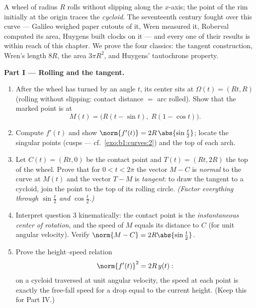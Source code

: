 \begin{problem}\label{pb:b1:curves:1}
A wheel of radius $R$ rolls without slipping along the $x$-axis;
the point of the rim initially at the origin traces the
\emph{cycloid}. The seventeenth century fought over this curve
--- Galileo weighed paper cutouts of it, Wren measured it,
Roberval computed its area, Huygens built clocks on it --- and
every one of their results is within reach of this chapter. We
prove the four classics: the tangent construction, Wren's length
$8R$, the area $3\pi R^2$, and Huygens' tautochrone
property.

\medskip
\noindent\textbf{Part I --- Rolling and the tangent.}
\begin{enumerate}
  \item After the wheel has turned by an angle $t$, its center
        sits at $\Omega(t) = (Rt, R)$ (rolling without slipping:
        contact distance $=$ arc rolled). Show that the marked
        point is at
        \[
        M(t) = \bigl(R(t - \sin t),\; R(1 - \cos t)\bigr).
        \]
  \item Compute $f'(t)$ and show $\norm{f'(t)} =
        2R\,\abs{\sin\frac t2}$; locate the singular points
        (cusps --- cf.\ \cref{exo:b1:curves:2}) and the top of
        each arch.
  \item Let $C(t) = (Rt, 0)$ be the contact point and $T(t) =
        (Rt, 2R)$ the top of the wheel. Prove that for $0 < t <
        2\pi$ the vector $M - C$ is \emph{normal} to the curve at
        $M(t)$ and the vector $T - M$ is \emph{tangent}: to draw
        the tangent to a cycloid, join the point to the top of
        its rolling circle. \emph{(Factor everything through
        $\sin\frac t2$ and $\cos\frac t2$.)}
  \item Interpret question 3 kinematically: the contact point is
        the \emph{instantaneous center of rotation}, and the
        speed of $M$ equals its distance to $C$ (for unit angular
        velocity). Verify $\norm{M - C} = 2R\abs{\sin\frac t2}$.
  \item Prove the height--speed relation
        \[
        \norm{f'(t)}^2 = 2R\,y(t) :
        \]
        on a cycloid traversed at unit angular velocity, the
        speed at each point is exactly the free-fall speed for a
        drop equal to the current height. (Keep this for
        Part IV.)
\end{enumerate}


\end{problem}
